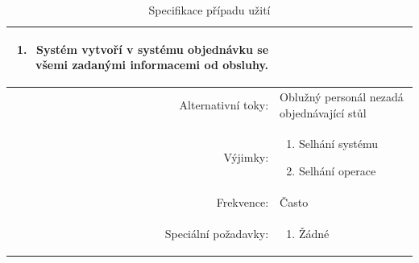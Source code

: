 \documentclass[a4paper,10pt]{article}
\begin{document}
\begin{table}[ht!]
{\begin{tabular}{| r | p{12cm} |}
\begin{minipage}[t]{0.75\textwidth}
\begin{enumerate}[nosep,after=\strut]
            \item Systém vytvoří v systému objednávku se všemi zadanými informacemi od obsluhy.
    	\end{enumerate}
  	\end{minipage} \\
    \hline 
    Alternativní toky: & Oblužný personál nezadá objednávající stůl  \\
    \hline
    Výjimky: & 
    \begin{minipage}[t]{0.75\textwidth}
    	\begin{enumerate}[nosep,after=\strut] 
            \item Selhání systému
            \item Selhání operace
    	\end{enumerate}
  	\end{minipage} \\
    \hline
    Frekvence: & Často \\
    \hline
    Speciální požadavky: & 
    \begin{minipage}[t]{0.75\textwidth}
    	\begin{enumerate}[nosep,after=\strut]
    		\item Žádné
    	\end{enumerate}
  	\end{minipage} \\
    \hline

\end{tabular}}
\caption{Specifikace případu užití }
\label{table:1}
\end{table}
\end{document}
